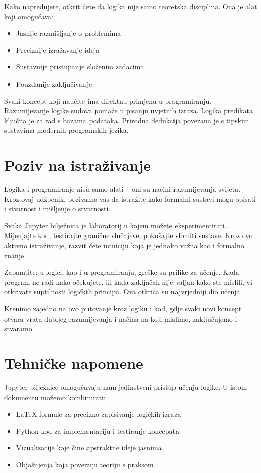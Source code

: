 Kako napredujete, otkrit ćete da logika nije samo teoretska disciplina. Ona je alat koji omogućava:
\begin{itemize}
\item Jasnije razmišljanje o problemima
\item Preciznije izražavanje ideja
\item Sustavnije pristupanje složenim zadacima
\item Pouzdanije zaključivanje
\end{itemize}

Svaki koncept koji naučite ima direktnu primjenu u programiranju. Razumijevanje logike sudova pomaže u pisanju uvjetnih izraza. Logika predikata ključna je za rad s bazama podataka. Prirodna dedukcija povezana je s tipskim sustavima modernih programskih jezika.

\section*{Poziv na istraživanje}

Logika i programiranje nisu samo alati -- oni su načini razumijevanja svijeta. Kroz ovaj udžbenik, pozivamo vas da istražite kako formalni sustavi mogu opisati i stvarnost i mišljenje o stvarnosti.

Svaka Jupyter bilježnica je laboratorij u kojem možete eksperimentirati. Mijenjajte kod, testirajte granične slučajeve, pokušajte slomiti sustave. Kroz ovo aktivno istraživanje, razvit ćete intuiciju koja je jednako važna kao i formalno znanje.

Zapamtite: u logici, kao i u programiranju, greške su prilike za učenje. Kada program ne radi kako očekujete, ili kada zaključak nije valjan kako ste mislili, vi otkrivate suptilnosti logičkih principa. Ova otkrića su najvrjedniji dio učenja.

Krenimo zajedno na ovo putovanje kroz logiku i kod, gdje svaki novi koncept otvara vrata dubljeg razumijevanja i načina na koji mislimo, zaključujemo i stvaramo.

\section*{Tehničke napomene}

Jupyter bilježnice omogućavaju nam jedinstveni pristup učenju logike. U istom dokumentu možemo kombinirati:
\begin{itemize}
\item LaTeX formule za precizno zapisivanje logičkih izraza
\item Python kod za implementaciju i testiranje koncepata
\item Vizualizacije koje čine apstraktne ideje jasnima
\item Objašnjenja koja povezuju teoriju s praksom
\end{itemize}

